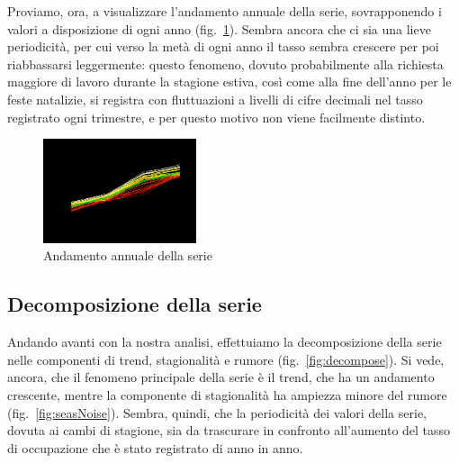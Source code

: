 \documentclass[11pt,a4paper,oneside]{article}
\begin{document}
Proviamo, ora, a visualizzare l'andamento annuale della serie, sovrapponendo i valori a disposizione di ogni anno (fig.~\ref{fig:plotPeriodi}). Sembra ancora che ci sia una lieve periodicità, per cui verso la metà di ogni anno il tasso sembra crescere per poi riabbassarsi leggermente: questo fenomeno, dovuto probabilmente alla richiesta maggiore di lavoro durante la stagione estiva, così come alla fine dell'anno per le feste natalizie, si registra con fluttuazioni a livelli di cifre decimali nel tasso registrato ogni trimestre, e per questo motivo non viene facilmente distinto.
\begin{figure}[h]
\centering
\includegraphics[width=0.4\textwidth]{images/plotPeriodi}
\caption{Andamento annuale della serie}
\label{fig:plotPeriodi}
\end{figure}

\subsection{Decomposizione della serie}
Andando avanti con la nostra analisi, effettuiamo la decomposizione della serie nelle componenti di trend, stagionalità e rumore (fig.~\ref{fig:decompose}). Si vede, ancora, che il fenomeno principale della serie è il trend, che ha un andamento crescente, mentre la componente di stagionalità ha ampiezza minore del rumore (fig.~\ref{fig:seasNoise}).
Sembra, quindi, che la periodicità dei valori della serie, dovuta ai cambi di stagione, sia da trascurare in confronto all'aumento del tasso di occupazione che è stato registrato di anno in anno. 
\begin{figure}[h]
\centering
{}
 \\
\caption{}
\label{fig:graficiDiff}
\end{figure}
\end{document}
